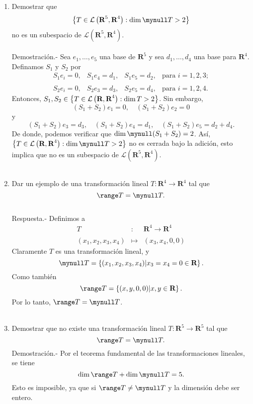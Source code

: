 \begin{enumerate}[\bfseries 1.]
\begin{enumerate}[(a)]
    \end{enumerate}

    \item Demostrar que
    $$\left\{ T\in \mathcal{L}\left(\textbf{R}^5,\textbf{R}^4\right):\dim \mynull T>2 \right\}$$
    no es un subespacio de $\mathcal{L}\left(\textbf{R}^5,\textbf{R}^4\right)$.\\\\
	Demostración.-\; Sea $e_1,\ldots,e_5$ una base de $\textbf{R}^5$ y sea $d_1,\ldots,d_4$ una base para $\textbf{R}^4$. Definamos $S_1$ y $S_2$ por
	$$
	\begin{array}{cccc}
	    S_1e_i=0,&S_1e_4=d_1,&S_1e_5=d_2,&\mbox{para } i=1,2,3;\\\\
	    S_2e_i=0,&S_2e_3=d_3,&S_2e_5=d_4,&\mbox{para } i=1,2,4.
	\end{array}
	$$
	Entonces, $S_1,S_2\in \left\{T\in \mathcal{L}\left(\textbf{R},\textbf{R}^4\right):\dim \null T > 2\right\}$. Sin embargo,
	$$(S_1+S_2)e_1=0,\quad (S_1+S_2)e_2=0$$
	y
	$$(S_1+S_2)e_3=d_3, \quad (S_1+S_2)e_4=d_1, \quad (S_1+S_2)e_5=d_2+d_4.$$
	De donde, podemos verificar que $\dim \mynull(S_1+S_2)=2$. Así, $\left\{T\in \mathcal{L}\left(\textbf{R},\textbf{R}^4\right):\dim \mynull T > 2\right\}$ no es cerrada bajo la adición, esto implica que no es un subespacio de $\mathcal{L}\left(\textbf{R}^5,\textbf{R}^4\right)$.\\\\

    \item Dar un ejemplo de una transformación lineal $T:\textbf{R}^4\to \textbf{R}^4$ tal que
    $$\range T=\mynull T.$$\\
	Respuesta.-\; Definimos a
	$$
	\begin{array}{rcl}
	    T &:& \textbf{R}^4\to \textbf{R}^4\\\\
	    (x_1,x_2,x_3,x_4) &\mapsto & (x_3,x_4,0,0)
	\end{array}
	$$
	Claramente $T$ es una transformación lineal, y 
	$$\mynull T = \left\{(x_1,x_2,x_3,x_4) | x_3=x_4=0 \in \textbf{R}\right\}.$$
	Como también 
	$$\range T = \left\{(x,y,0,0) | x,y \in \textbf{R}\right\}.$$
	Por lo tanto, $\range T = \mynull T$.\\\\

    \item Demostrar que no existe una transformación lineal $T:\textbf{R}^5\to \textbf{R}^5$ tal que
    $$\range T = \mynull T.$$
	Demostración.-\; Por el teorema fundamental de las transformaciones lineales, se tiene
	$$\dim \range T + \dim \mynull T = 5.$$
	Esto es imposible, ya que si $\range T \neq \mynull T$  y la dimensión debe ser entero.\\\\


\end{enumerate}
